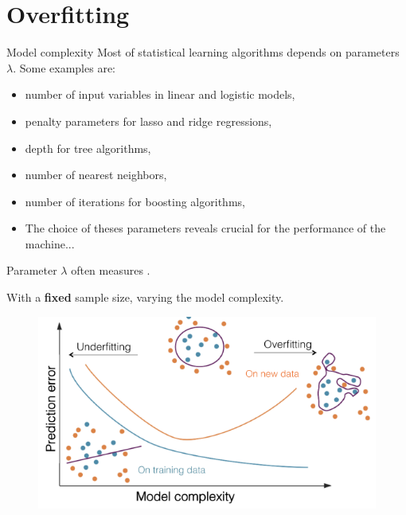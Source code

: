 \documentclass[xcolor={usenames,dvipsnames},handout]{beamer}
\begin{document}
\section{Overfitting}
 

 \begin{frame}{Model complexity}
 Most of statistical learning algorithms depends on parameters $\lambda$.
Some examples are:
\begin{itemize}
\item number of input variables in linear and logistic models,
\item penalty parameters for lasso and ridge regressions,
\item depth for tree algorithms,
\item number of nearest neighbors,
\item number of iterations for boosting algorithms, 
\item The choice of theses parameters reveals crucial for the performance of the machine...
\end{itemize}
 
 
  Parameter $\lambda$ often measures .
\end{frame}


\begin{frame}
With a \textbf{fixed} sample size, varying the model complexity.
\begin{figure}
\begin{center}
\includegraphics[width=\textwidth]{overfitting}
\end{center}
\end{figure}
\end{frame}
\end{document}
